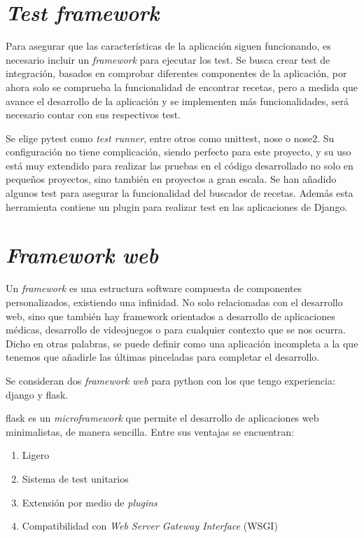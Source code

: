 \section{\emph{Test framework}}
Para asegurar que las características de la aplicación siguen funcionando, es necesario incluir un \emph{framework} para ejecutar los test. Se busca crear test de integración, basados en comprobar diferentes componentes de la aplicación, por ahora solo se comprueba la funcionalidad de encontrar recetas, pero a medida que avance el desarrollo de la aplicación y se implementen más funcionalidades, será necesario contar con sus respectivos test.

Se elige pytest como \emph{test runner}, entre otros como unittest, nose o nose2. Su configuración no tiene complicación, siendo perfecto para este proyecto, y su uso está muy extendido para realizar las pruebas en el código desarrollado no solo en pequeños proyectos, sino también en proyectos a gran escala. Se han añadido algunos test para asegurar la funcionalidad del buscador de recetas. Además esta herramienta contiene un plugin para realizar test en las aplicaciones de Django.

\section{\emph{Framework web}}
Un \emph{\gls{framework}} es una estructura software compuesta de componentes personalizados, existiendo una infinidad. No solo relacionadas con el desarrollo web, sino que también hay \gls{framework} orientados a desarrollo de aplicaciones médicas, desarrollo de videojuegos o para cualquier contexto que se nos ocurra. Dicho en otras palabras, se puede definir como una aplicación incompleta a la que tenemos que añadirle las últimas pinceladas para completar el desarrollo. 

Se consideran dos \emph{framework web} para \Gls{python} con los que tengo experiencia: \Gls{django} y \Gls{flask}. 

\Gls{flask} es un \emph{microframework} que permite el desarrollo de aplicaciones web minimalistas, de manera sencilla. Entre sus ventajas se encuentran:
\begin{enumerate}
    \item Ligero
    \item Sistema de test unitarios
    \item Extensión por medio de \emph{plugins}
    \item Compatibilidad con \emph{Web Server Gateway Interface} (WSGI)
\end{enumerate}

